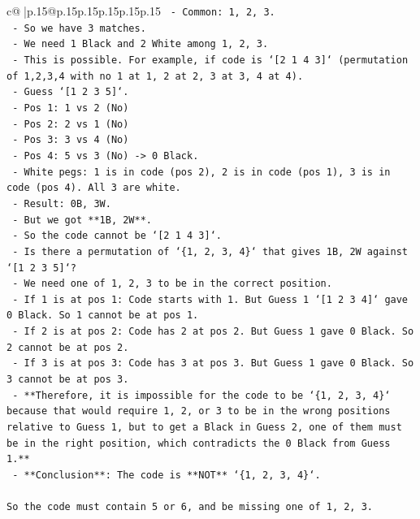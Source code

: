 \documentclass{article}
\begin{document}
{\begin{supertabular}{c@{$\;$}|p{.15\linewidth}@{}p{.15\linewidth}p{.15\linewidth}p{.15\linewidth}p{.15\linewidth}p{.15\linewidth}}
{{{\texttt{      {-} Common: 1, 2, 3.} \\
\texttt{      {-} So we have 3 matches.} \\
\texttt{      {-} We need 1 Black and 2 White among 1, 2, 3.} \\
\texttt{      {-} This is possible. For example, if code is `{[}2 1 4 3{]}` (permutation of 1,2,3,4 with no 1 at 1, 2 at 2, 3 at 3, 4 at 4).} \\
\texttt{        {-} Guess `{[}1 2 3 5{]}`.} \\
\texttt{        {-} Pos 1: 1 vs 2 (No)} \\
\texttt{        {-} Pos 2: 2 vs 1 (No)} \\
\texttt{        {-} Pos 3: 3 vs 4 (No)} \\
\texttt{        {-} Pos 4: 5 vs 3 (No) {-}> 0 Black.} \\
\texttt{        {-} White pegs: 1 is in code (pos 2), 2 is in code (pos 1), 3 is in code (pos 4). All 3 are white.} \\
\texttt{        {-} Result: 0B, 3W.} \\
\texttt{        {-} But we got **1B, 2W**.} \\
\texttt{        {-} So the code cannot be `{[}2 1 4 3{]}`.} \\
\texttt{        {-} Is there a permutation of `\{1, 2, 3, 4\}` that gives 1B, 2W against `{[}1 2 3 5{]}`?} \\
\texttt{        {-} We need one of 1, 2, 3 to be in the correct position.} \\
\texttt{        {-} If 1 is at pos 1: Code starts with 1. But Guess 1 `{[}1 2 3 4{]}` gave 0 Black. So 1 cannot be at pos 1.} \\
\texttt{        {-} If 2 is at pos 2: Code has 2 at pos 2. But Guess 1 gave 0 Black. So 2 cannot be at pos 2.} \\
\texttt{        {-} If 3 is at pos 3: Code has 3 at pos 3. But Guess 1 gave 0 Black. So 3 cannot be at pos 3.} \\
\texttt{        {-} **Therefore, it is impossible for the code to be `\{1, 2, 3, 4\}` because that would require 1, 2, or 3 to be in the wrong positions relative to Guess 1, but to get a Black in Guess 2, one of them must be in the right position, which contradicts the 0 Black from Guess 1.**} \\
\texttt{        {-} **Conclusion**: The code is **NOT** `\{1, 2, 3, 4\}`.} \\
\\ 
\texttt{So the code must contain 5 or 6, and be missing one of 1, 2, 3.} \\
}}}
\end{supertabular}}
\end{document}
